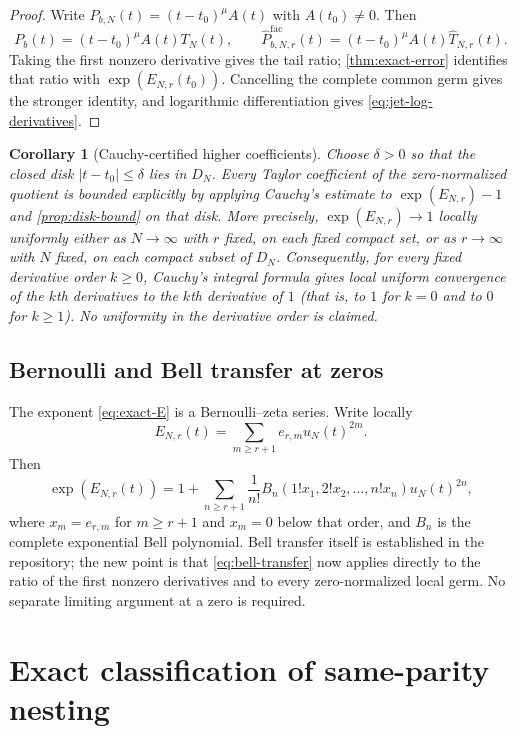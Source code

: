\documentclass[11pt,oneside]{article}
\numberwithin{equation}{section}
\theoremstyle{frontier}
\newtheorem{corollary}[theorem]{Corollary}
\theoremstyle{definition}
\theoremstyle{remark}
\begin{document}
\begin{proof}
Write $P_{b,N}(t)=(t-t_0)^\mu A(t)$ with $A(t_0)\ne0$.  Then
\[
 P_b(t)=(t-t_0)^\mu A(t)T_N(t),\qquad
 \widehat P^{\mathrm{fac}}_{b,N,r}(t)=(t-t_0)^\mu A(t)\widehat T_{N,r}(t).
\]
Taking the first nonzero derivative gives the tail ratio; \cref{thm:exact-error} identifies
that ratio with $\exp(E_{N,r}(t_0))$.  Cancelling the complete common germ gives the stronger
identity, and logarithmic differentiation gives \eqref{eq:jet-log-derivatives}.
\end{proof}

\begin{corollary}[Cauchy-certified higher coefficients]\label{cor:cauchy-jets}
Choose $\delta>0$ so that the closed disk $|t-t_0|\le\delta$ lies in $D_N$.  Every Taylor
coefficient of the zero-normalized quotient is bounded explicitly by applying Cauchy's
estimate to $\exp(E_{N,r})-1$ and \cref{prop:disk-bound} on that disk.  More precisely,
$\exp(E_{N,r})\to1$ locally uniformly either as $N\to\infty$ with $r$ fixed, on each fixed
compact set, or as $r\to\infty$ with $N$ fixed, on each compact subset of $D_N$.
Consequently, for every fixed derivative order $k\ge0$, Cauchy's integral formula gives
local uniform convergence of the $k$th derivatives to the $k$th derivative of $1$ (that is,
to $1$ for $k=0$ and to $0$ for $k\ge1$).  No uniformity in the derivative order is claimed.
\end{corollary}

\subsection{Bernoulli and Bell transfer at zeros}

The exponent \eqref{eq:exact-E} is a Bernoulli--zeta series.  Write locally
\[
 E_{N,r}(t)=\sum_{m\ge r+1}e_{r,m}u_N(t)^{2m}.
\]
Then
\begin{equation}
 \exp(E_{N,r}(t))
 =1+\sum_{n\ge r+1}\frac{1}{n!}
 B_n(1!x_1,2!x_2,\ldots,n!x_n)u_N(t)^{2n},
 \label{eq:bell-transfer}
\end{equation}
where $x_m=e_{r,m}$ for $m\ge r+1$ and $x_m=0$ below that order, and $B_n$ is the complete
exponential Bell polynomial.  Bell transfer itself is established in the repository; the new
point is that \eqref{eq:bell-transfer} now applies directly to the ratio of the first nonzero
derivatives and to every zero-normalized local germ.  No separate limiting argument at a zero
is required.

\section{Exact classification of same-parity nesting}\label{sec:nesting}
\end{document}
